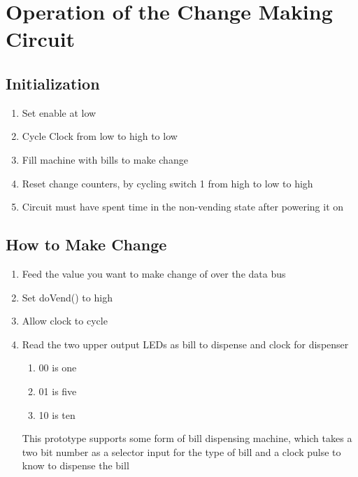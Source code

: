 \section{Operation of the Change Making Circuit}

\subsection{Initialization}
\begin{enumerate}
\item{Set enable at low}
\item{Cycle Clock from low to high to low}
\item{Fill machine with bills to make change}
\item{Reset change counters, by cycling switch 1 from high to low to high}
\item{Circuit must have spent time in the non-vending state after powering it on}
\end{enumerate}

\subsection{How to Make Change}
\begin{enumerate}
\item{Feed the value you want to make change of over the data bus}
\item{Set doVend() to high}
\item{Allow clock to cycle}
\item{Read the two upper output LEDs as bill to dispense and clock for dispenser}
\begin{enumerate}
\item{00 is one}
\item{01 is five}
\item{10 is ten}
\end{enumerate}
This prototype supports some form of bill dispensing machine, which takes a two bit number as a selector input for the type of bill and a clock pulse to know to dispense the bill
\end{enumerate}

